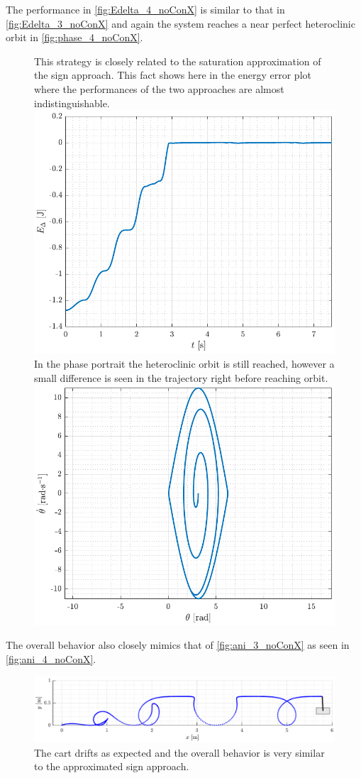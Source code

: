The performance in \autoref{fig:Edelta_4_noConX} is similar to that in \autoref{fig:Edelta_3_noConX} and again the system reaches a near perfect heteroclinic orbit in \autoref{fig:phase_4_noConX}.
%
\begin{figure}[H]
  \hspace{-10pt}
  \captionbox
  {
    This strategy is closely related to the saturation approximation of the sign approach. This fact shows here in the energy error plot where the performances of the two approaches are almost indistinguishable.
    \label{fig:Edelta_4_noConX}
  }
  {
    \hspace{-1cm}
    \includegraphics[width=.46\textwidth]{figures/Edelta_4_noConX}
  }
  \hspace{20pt}
  \captionbox 
  {
    In the phase portrait the heteroclinic orbit is still reached, however a small difference is seen in the trajectory right before reaching orbit.
    \label{fig:phase_4_noConX}
  }
  {
    \hspace{-1cm}
    \includegraphics[width=.46\textwidth]{figures/phase_4_noConX}
  }  
\end{figure}
%
The overall behavior also closely mimics that of \autoref{fig:ani_3_noConX} as seen in \autoref{fig:ani_4_noConX}.
\begin{figure}[H]
  \includegraphics[width=.7\textwidth]{figures/ani_4_noConX}
  \caption{The cart drifts as expected and the overall behavior is very similar to the approximated sign approach.}
  \label{fig:ani_4_noConX}
\end{figure}
